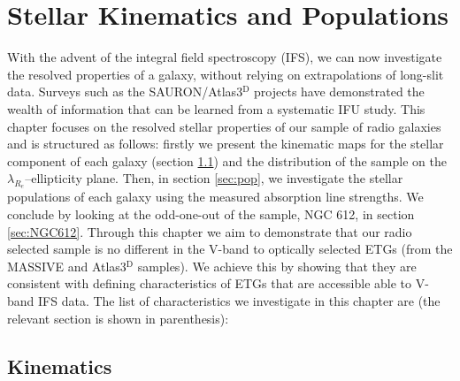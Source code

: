 \chapter{Stellar Kinematics and Populations}
	\label{cha:stellar}
With the advent of the integral field spectroscopy (IFS), we can now investigate the resolved properties of a galaxy, without relying on extrapolations of long-slit data. Surveys such as the SAURON/Atlas3$^\text{D}$ projects have demonstrated the wealth of information that can be learned from a systematic IFU study. This chapter focuses on the resolved stellar properties of our sample of radio galaxies and is structured as follows: firstly we present the kinematic maps for the stellar component of each galaxy (section \ref{sec:stellarKin}) and the distribution of the sample on the $\lambda_{R_e}$--ellipticity plane. Then, in section \ref{sec:pop}, we investigate the stellar populations of each galaxy using the measured absorption line strengths. We conclude by looking at the odd-one-out of the sample, NGC 612, in section \ref{sec:NGC612}. Through this chapter we aim to demonstrate that our radio selected sample is no different in the V-band to optically selected ETGs (from the MASSIVE and Atlas3$^\text{D}$ samples). We achieve this by showing that they are consistent with defining characteristics of ETGs that are accessible able to V-band IFS data. The list of characteristics we investigate in this chapter are (the relevant section is shown in parenthesis):

\section{Kinematics}
	\label{sec:stellarKin}

